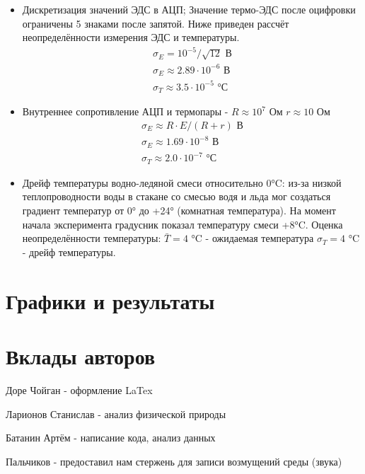 \documentclass[a4paper,12pt]{article}
\begin{document}
\begin{itemize}[label={---}] 
    \item Дискретизация значений ЭДС в АЦП;
    Значение термо-ЭДС после оцифровки ограничены 5 знаками после запятой. Ниже приведен рассчёт неопределённости измерения ЭДС и температуры.
    \begin{equation} 
    \begin{aligned}
	\sigma_{E} = 10^{-5}/\sqrt{12}  \text{ В}\\
	\sigma_{E} \approx 2.89\cdot10^{-6} \text{ В}\\
	\sigma_{T} \approx 3.5\cdot10^{-5} \text{ °С}
    \end{aligned}
    \end{equation}
    \item Внутреннее сопротивление АЦП и термопары - $R \approx 10^7$ Ом $r \approx 10$ Ом 
    \begin{equation} 
    \begin{aligned}
	\sigma_{E} \approx R \cdot E/(R+r)  \text{ В}\\
	\sigma_{E} \approx 1.69\cdot10^{-8} \text{ В}\\
	\sigma_{T} \approx 2.0\cdot10^{-7} \text{ °С}
    \end{aligned}
    \end{equation}

    \item Дрейф температуры водно-ледяной смеси относительно 0°C: из-за низкой теплопроводности воды в стакане со смесью водя и льда мог создаться градиент температур от 0° до +24° (комнатная температура). На момент начала эксперимента градусник показал температуру смеси +8°C. Оценка неопределённости температуры: $\bar{T} = 4$ °C - ожидаемая температура  $\sigma_{T} = 4$ °C - дрейф температуры.
\end{itemize}

\section{Графики и результаты}

\section{Вклады авторов}

Доре Чойган - оформление LaTex

Ларионов Станислав - анализ физической природы

Батанин Артём - написание кода, анализ данных

Пальчиков - предоставил нам стержень для записи возмущений среды (звука)
\end{document}
